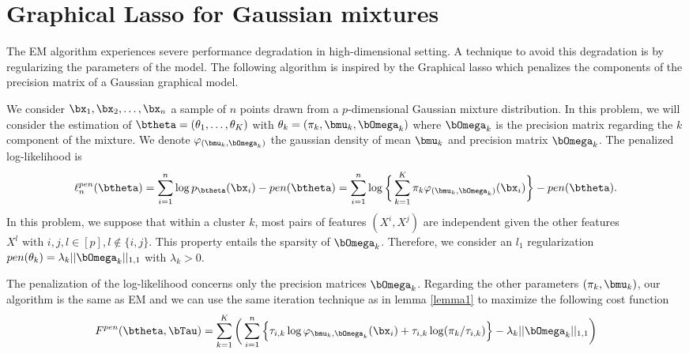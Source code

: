 
\chapter{Graphical Lasso for Gaussian mixtures}

The EM algorithm experiences severe performance degradation in high-dimensional setting. A technique to avoid this degradation is by regularizing the parameters of the model. The following algorithm is inspired by the Graphical lasso \citep{glasso07} \citep{banerjee} which penalizes the components of the precision matrix of a Gaussian graphical model.\

We consider $\bx_1,\bx_2,\dots,\bx_n$ a sample of $n$ points drawn from a $p$-dimensional Gaussian mixture distribution. In this problem, we will consider the estimation of $\btheta=(\theta_1,\dots,\theta_K)$ with $\theta_k=(\pi_k, \bmu_k, \bOmega_k)$ where $\bOmega_k$ is the precision matrix regarding the $k$ component of the mixture. We denote $\varphi_{(\bmu_{k},\bOmega_{k})}$ the gaussian density of mean $\bmu_k$ and precision matrix $\bOmega_k$. The penalized log-likelihood is
\begin{equation}\label{pen-log-likelihood}
\ell_n^{pen}(\btheta)=\sum_{i=1}^{n}\log p_{\btheta}(\bx_i)-pen(\btheta)= \sum_{i=1}^{n}\log \bigg\{ \sum_{k=1}^K\pi_k\varphi_{(\bmu_{k},\bOmega_{k})}(\bx_i)\bigg\} -pen(\btheta).
\end{equation}
In this problem, we suppose that within a cluster $k$, most pairs of features $(X^i,X^j)$ are independent given the other features $X^l \text{ with } i,j,l\in[p], l\notin\{i,j \}$. This property entails the sparsity of $\bOmega_k$. 
Therefore, we consider an $l_1$ regularization $pen(\theta_k)=\lambda_k||\bOmega_k||_{1,1}$ with $\lambda_k>0$.\

The penalization of the log-likelihood concerns only the precision matrices $\bOmega_k$. Regarding the other parameters $(\pi_k, \bmu_k)$, our algorithm is the same as EM and we can use the same iteration technique as in lemma \ref{lemma1} to maximize the following cost function
\begin{equation}
\label{cost_fun_pen}
F^{pen}(\btheta,\bTau)  = \sum_{k=1}^K \bigg(\sum_{i=1}^{n} \Big\{\tau_{i,k}\log\varphi_{\bmu_{k},\bOmega_{k}}(\bx_i)+\tau_{i,k}
    \log(\pi_k/\tau_{i,k})\Big\}-\lambda_k||\bOmega_k||_{1,1}\bigg)
\end{equation}

